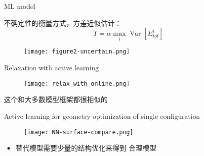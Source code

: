 \documentclass[xcolor=x11names,UTF8]{ctexbeamer}
\begin{document}
\begin{frame}{ML model}

    不确定性的衡量方式，方差近似估计：
  \begin{equation}
      T=\alpha \max _{i} \operatorname{Var}\left[E_{tot}^{i}\right]
  \end{equation}

  \begin{figure}
    \texttt{[image: figure2-uncertain.png]}
  \end{figure}



\end{frame}

\begin{frame}{Relaxation with active learning}
  \begin{figure}
      \centering
      \texttt{[image: relax\_with\_online.png]}
  \end{figure}

这个和大多数模型框架都很相似的




\end{frame}
\begin{frame}{Active learning for geometry optimization of single configuration}

  \begin{figure}
      \centering
      \texttt{[image: NN-surface-compare.png]}
  \end{figure}

    \begin{itemize}
        \item 替代模型需要少量的结构优化来得到 合理模型
    \end{itemize}
\end{frame}
\end{document}

